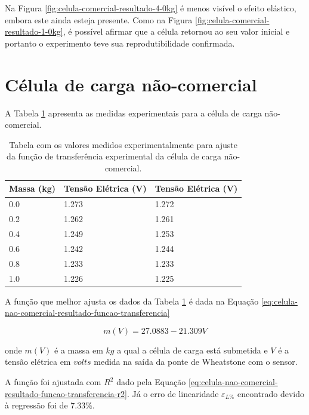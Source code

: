 \documentclass[a4paper]{instrumentacao}
\begin{document}
Na Figura \ref{fig:celula-comercial-resultado-4-0kg} é menos visível o efeito elástico, embora este ainda esteja presente. Como na Figura \ref{fig:celula-comercial-resultado-1-0kg}, é possível afirmar que a célula retornou ao seu valor inicial e portanto o experimento teve sua reprodutibilidade confirmada.

\section{Célula de carga não-comercial}
A Tabela \ref{tab:celula-nao-comercial-resultado-funcao-transferencia} apresenta as medidas experimentais para a célula de carga não-comercial.


\begin{table}[H]
\centering
\caption{Tabela com os valores medidos experimentalmente para ajuste da função de transferência experimental da célula de carga não-comercial.}
\begin{tabular}{|l|l|l|}

\hline
\textbf{Massa (kg)} & \textbf{Tensão Elétrica (V)} & \textbf{Tensão Elétrica (V)} \\ \hline
 0.0 & 1.273 & 1.272 \\ \hline
 0.2 & 1.262 & 1.261 \\ \hline
 0.4 & 1.249 & 1.253 \\ \hline
 0.6 & 1.242 & 1.244 \\ \hline
 0.8 & 1.233 & 1.233 \\ \hline
 1.0 & 1.226 & 1.225 \\ \hline
\end{tabular}
\label{tab:celula-nao-comercial-resultado-funcao-transferencia}
\end{table}

A função que melhor ajusta os dados da Tabela \ref{tab:celula-nao-comercial-resultado-funcao-transferencia} é dada na Equação \ref{eq:celula-nao-comercial-resultado-funcao-transferencia}

\begin{equation}
	m(V) = 27.0883 - 21.309 V
	\label{eq:celula-nao-comercial-resultado-funcao-transferencia}
\end{equation}

\noindent onde $m(V)$ é a massa em $kg$ a qual a célula de carga está submetida e $V$ é a tensão elétrica em $volts$ medida na saída da ponte de Wheatstone com o sensor.

A função foi ajustada com $R^2$ dado pela Equação \ref{eq:celula-nao-comercial-resultado-funcao-transferencia-r2}. Já o erro de linearidade $\varepsilon_{L\%}$ encontrado devido à regressão foi de $7.33\%$.
\end{document}
